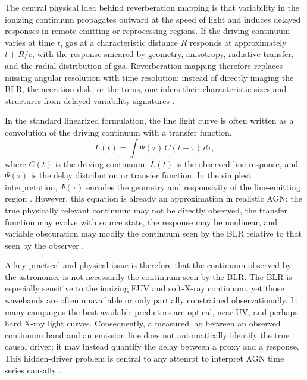 \documentclass{article}
\begin{document}
The central physical idea behind reverberation mapping is that variability in the ionizing continuum propagates outward at the speed of light and induces delayed responses in remote emitting or reprocessing regions. If the driving continuum varies at time \(t\), gas at a characteristic distance \(R\) responds at approximately \(t+R/c\), with the response smeared by geometry, anisotropy, radiative transfer, and the radial distribution of gas. Reverberation mapping therefore replaces missing angular resolution with time resolution: instead of directly imaging the BLR, the accretion disk, or the torus, one infers their characteristic sizes and structures from delayed variability signatures \cite{Cackett2021,Peterson2006}.

In the standard linearized formulation, the line light curve is often written as a convolution of the driving continuum with a transfer function,
\begin{equation}
L(t)=\int \Psi(\tau)\,C(t-\tau)\,d\tau,
\label{eq:transfer}
\end{equation}
where \(C(t)\) is the driving continuum, \(L(t)\) is the observed line response, and \(\Psi(\tau)\) is the delay distribution or transfer function. In the simplest interpretation, \(\Psi(\tau)\) encodes the geometry and responsivity of the line-emitting region \cite{Peterson2006,Cackett2021}. However, this equation is already an approximation in realistic AGN: the true physically relevant continuum may not be directly observed, the transfer function may evolve with source state, the response may be nonlinear, and variable obscuration may modify the continuum seen by the BLR relative to that seen by the observer \cite{Cackett2021,Dehghanian2019}.

A key practical and physical issue is therefore that the continuum observed by the astronomer is not necessarily the continuum seen by the BLR. The BLR is especially sensitive to the ionizing EUV and soft-X-ray continuum, yet those wavebands are often unavailable or only partially constrained observationally. In many campaigns the best available predictors are optical, near-UV, and perhaps hard X-ray light curves. Consequently, a measured lag between an observed continuum band and an emission line does not automatically identify the true causal driver; it may instead quantify the delay between a proxy and a response. This hidden-driver problem is central to any attempt to interpret AGN time series causally \cite{Cackett2021,Dehghanian2019}.
\end{document}
